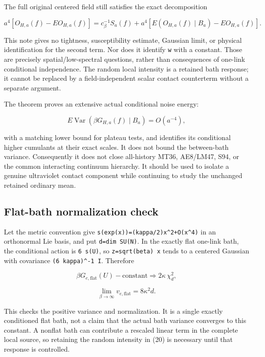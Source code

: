 \documentclass[
  11pt,
]{article}
\begin{document}
The full original centered field still satisfies the exact decomposition

\[
 a^4[O_{H,a}(f)-EO_{H,a}(f)]
 =c_\beta^{-1}S_a(f)
  +a^4[E(O_{H,a}(f)\mid B_a)-EO_{H,a}(f)].
 \tag{21}
\]

This note gives no tightness, susceptibility estimate, Gaussian limit,
or physical identification for the second term. Nor does it identify
\texttt{w} with a constant. Those are precisely spatial/low-spectral
questions, rather than consequences of one-link conditional
independence. The random local intensity is a retained bath response; it
cannot be replaced by a field-independent scalar contact counterterm
without a separate argument.

The theorem proves an extensive actual conditional noise energy:

\[
 E\operatorname{Var}(\beta G_{H,a}(f)\mid B_a)=O(a^{-4}),
\]

with a matching lower bound for plateau tests, and identifies its
conditional higher cumulants at their exact scales. It does not bound
the between-bath variance. Consequently it does not close all-history
MT36, AE8/LM47, S94, or the common interacting continuum hierarchy. It
should be used to isolate a genuine ultraviolet contact component while
continuing to study the unchanged retained ordinary mean.

\hypertarget{flat-bath-normalization-check}{%
\subsection{Flat-bath normalization
check}\label{flat-bath-normalization-check}}

Let the metric convention give
\texttt{s(exp(x))=(kappa/2)\textbar{}x\textbar{}\^{}2+O(\textbar{}x\textbar{}\^{}4)}
in an orthonormal Lie basis, and put \texttt{d=dim\ SU(N)}. In the
exactly flat one-link bath, the conditional action is \texttt{6\ s(U)},
so \texttt{z=sqrt(beta)\ x} tends to a centered Gaussian with covariance
\texttt{(6\ kappa)\^{}-1\ I}. Therefore

\[
 \beta G_{e,\mathrm{flat}}(U)-\text{constant}
 \Longrightarrow 2\kappa\,\chi_d^2,
\]

\[
 \lim_{\beta\to\infty}v_{e,\mathrm{flat}}=8\kappa^2d.
 \tag{22}
\]

This checks the positive variance and normalization. It is a single
exactly conditioned flat bath, not a claim that the actual bath variance
converges to this constant. A nonflat bath can contribute a rescaled
linear term in the complete local source, so retaining the random
intensity in (20) is necessary until that response is controlled.
\end{document}
